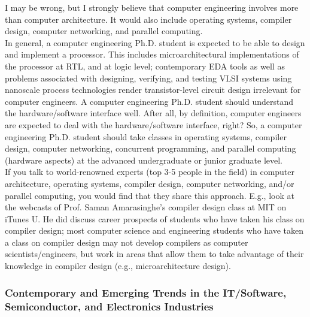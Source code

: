I may be wrong, but I strongly believe that computer engineering involves more than computer architecture. It would also include operating systems, compiler design, computer networking, and parallel computing. \\ %

In general, a computer engineering Ph.D. student is expected to be able to design and implement a processor. This includes microarchitectural implementations of the processor at RTL, and at logic level; contemporary EDA tools as well as problems associated with designing, verifying, and testing VLSI systems using nanoscale process technologies render transistor-level circuit design irrelevant for computer engineers. A computer engineering Ph.D. student should understand the hardware/software interface well. After all, by definition, computer engineers are expected to deal with the hardware/software interface, right? So, a computer engineering Ph.D. student should take classes in operating systems, compiler design, computer networking, concurrent programming, and parallel computing (hardware aspects) at the advanced undergraduate or junior graduate level. \\

If you talk to world-renowned experts (top 3-5 people in the field) in computer architecture, operating systems, compiler design, computer networking, and/or parallel computing, you would find that they share this approach. E.g., look at the webcasts of Prof. Saman Amarasinghe's compiler design class at MIT on iTunes U. He did discuss career prospects of students who have taken his class on compiler design; most computer science and engineering students who have taken a class on compiler design may not develop compilers as computer scientists/engineers, but work in areas that allow them to take advantage of their knowledge in compiler design (e.g., microarchitecture design).



\subsubsection{\hspace{0.1in} Contemporary and Emerging Trends in the IT/Software, Semiconductor, and Electronics Industries}
\label{trendsinitseminelectronics}

